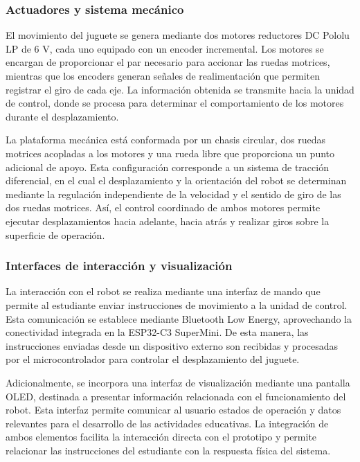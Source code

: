 \documentclass[11pt]{article}
\begin{document}
\subsubsection{Actuadores y sistema mecánico}

El movimiento del juguete se genera mediante dos motores reductores DC Pololu LP de 6 V, cada uno equipado con un encoder incremental. Los motores se encargan de proporcionar el par necesario para accionar las ruedas motrices, mientras que los encoders generan señales de realimentación que permiten registrar el giro de cada eje. La información obtenida se transmite hacia la unidad de control, donde se procesa para determinar el comportamiento de los motores durante el desplazamiento.

La plataforma mecánica está conformada por un chasis circular, dos ruedas motrices acopladas a los motores y una rueda libre que proporciona un punto adicional de apoyo. Esta configuración corresponde a un sistema de tracción diferencial, en el cual el desplazamiento y la orientación del robot se determinan mediante la regulación independiente de la velocidad y el sentido de giro de las dos ruedas motrices. Así, el control coordinado de ambos motores permite ejecutar desplazamientos hacia adelante, hacia atrás y realizar giros sobre la superficie de operación.

\subsubsection{Interfaces de interacción y visualización}

La interacción con el robot se realiza mediante una interfaz de mando que permite al estudiante enviar instrucciones de movimiento a la unidad de control. Esta comunicación se establece mediante Bluetooth Low Energy, aprovechando la conectividad integrada en la ESP32-C3 SuperMini. De esta manera, las instrucciones enviadas desde un dispositivo externo son recibidas y procesadas por el microcontrolador para controlar el desplazamiento del juguete.

Adicionalmente, se incorpora una interfaz de visualización mediante una pantalla OLED, destinada a presentar información relacionada con el funcionamiento del robot. Esta interfaz permite comunicar al usuario estados de operación y datos relevantes para el desarrollo de las actividades educativas. La integración de ambos elementos facilita la interacción directa con el prototipo y permite relacionar las instrucciones del estudiante con la respuesta física del sistema.
\end{document}
